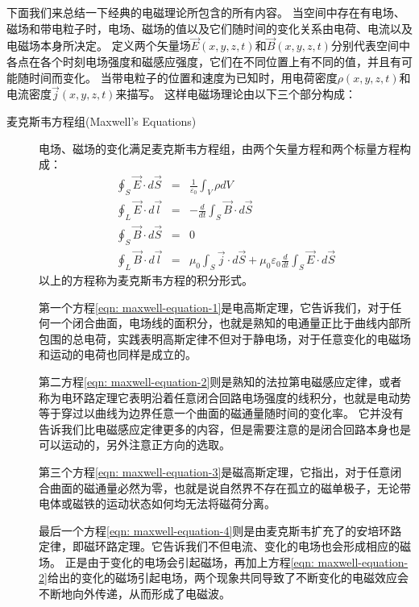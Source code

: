 下面我们来总结一下经典的电磁理论所包含的所有内容。
当空间中存在有电场、磁场和带电粒子时，电场、磁场的值以及它们随时间的变化关系由电荷、电流以及电磁场本身所决定。
定义两个矢量场$\vec{E}(x,y,z,t)$和$\vec{B}(x,y,z,t)$分别代表空间中各点在各个时刻电场强度和磁感应强度，它们在不同位置上有不同的值，并且有可能随时间而变化。
当带电粒子的位置和速度为已知时，用电荷密度$\rho(x,y,z,t)$和电流密度$\vec{j}(x,y,z,t)$来描写。
这样电磁场理论由以下三个部分构成：
\begin{description}
\item[{\heiti 麦克斯韦方程组}(Maxwell's Equations)]

电场、磁场的变化满足麦克斯韦方程组，由两个矢量方程和两个标量方程构成：
\begin{eqnarray}
\oint_S \vec{E}\cdot d\vec{S}&=& \frac{1}{\varepsilon_0}\int_V \rho dV\label{eqn: maxwell-equation-1}\\
\oint_L \vec{E}\cdot d\vec{l}&=& -\frac{d}{dt}\int_S \vec{B}\cdot d\vec{S}\label{eqn: maxwell-equation-2}\\
\oint_S \vec{B}\cdot d\vec{S}&=&\label{eqn: maxwell-equation-3} 0\\
\oint_L \vec{B}\cdot d\vec{l}& =& \mu_0\int_S \vec{j}\cdot d\vec{S} + \mu_0\varepsilon_0\frac{d}{d t }\int_S \vec{E}\cdot d\vec{S}\label{eqn: maxwell-equation-4}
\end{eqnarray}
以上的方程称为麦克斯韦方程的积分形式。

第一个方程\ref{eqn: maxwell-equation-1}是{\heiti 电高斯定理}，它告诉我们，对于任何一个闭合曲面，电场线的面积分，也就是熟知的电通量正比于曲线内部所包围的总电荷，实践表明高斯定律不但对于静电场，对于任意变化的电磁场和运动的电荷也同样是成立的。

第二方程\ref{eqn: maxwell-equation-2}则是熟知的{\heiti 法拉第电磁感应定律}，或者称为{\heiti 电环路定理}它表明沿着任意闭合回路电场强度的线积分，也就是电动势等于穿过以曲线为边界任意一个曲面的磁通量随时间的变化率。
它并没有告诉我们比电磁感应定律更多的内容，但是需要注意的是闭合回路本身也是可以运动的，另外注意正方向的选取。

第三个方程\ref{eqn: maxwell-equation-3}是{\heiti 磁高斯定理}，它指出，对于任意闭合曲面的磁通量必然为零，也就是说自然界不存在孤立的磁单极子，无论带电体或磁铁的运动状态如何均无法将磁荷分离。

最后一个方程\ref{eqn: maxwell-equation-4}则是由麦克斯韦扩充了的{\heiti 安培环路定律}，即{\heiti 磁环路定理}。它告诉我们不但电流、变化的电场也会形成相应的磁场。
正是由于变化的电场会引起磁场，再加上方程\ref{eqn: maxwell-equation-2}给出的变化的磁场引起电场，两个现象共同导致了不断变化的电磁效应会不断地向外传递，从而形成了电磁波。


\end{description}

